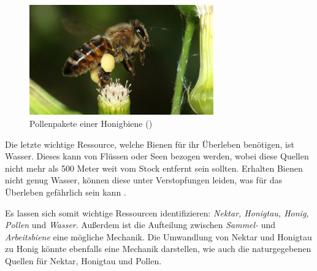 \begin{figure}
    \begin{center}
        \includegraphics[width=300px]{0.bilder/pollenpaket.jpg}
    \end{center}
    \caption{Pollenpakete einer Honigbiene (\cite{bees:name})} \label{image:pollenpaket}
\end{figure}

Die letzte wichtige Ressource, welche Bienen für ihr Überleben benötigen, ist Wasser. Dieses kann von Flüssen oder Seen bezogen werden, wobei diese Quellen nicht mehr als 500 Meter weit vom Stock entfernt sein sollten. Erhalten Bienen nicht genug Wasser, können diese unter Verstopfungen leiden, was für das Überleben gefährlich sein kann \cite*[]{bees:honeywinter, bees:food}.

Es lassen sich somit wichtige Ressourcen identifizieren: \textit{Nektar, Honigtau, Honig, Pollen} und \textit{Wasser}. Außerdem ist die Aufteilung zwischen \textit{Sammel-} und \textit{Arbeitsbiene} eine mögliche Mechanik. Die Umwandlung von Nektar und Honigtau zu Honig könnte ebenfalls eine Mechanik darstellen, wie auch die naturgegebenen Quellen für Nektar, Honigtau und Pollen.

